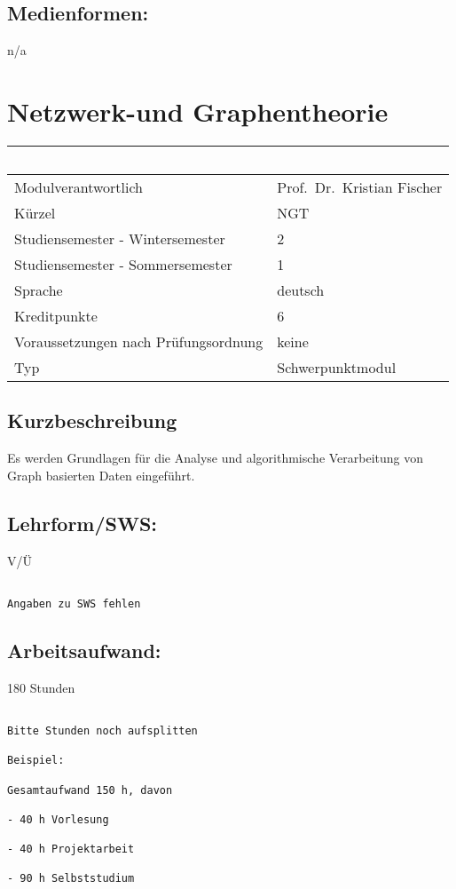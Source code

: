 \section*{Medienformen:}\label{medienformen-10}

n/a

\chapter{Netzwerk-und Graphentheorie}\label{netzwerk-und-graphentheorie}

\begin{longtable}[]{@{}ll@{}}
\toprule
~ & ~\tabularnewline
\midrule
\endhead
Modulverantwortlich & Prof.~Dr.~Kristian Fischer\tabularnewline
Kürzel & NGT\tabularnewline
Studiensemester - Wintersemester & 2\tabularnewline
Studiensemester - Sommersemester & 1\tabularnewline
Sprache & deutsch\tabularnewline
Kreditpunkte & 6\tabularnewline
Voraussetzungen nach Prüfungsordnung & keine\tabularnewline
Typ & Schwerpunktmodul\tabularnewline
\bottomrule
\end{longtable}

\section*{Kurzbeschreibung}\label{kurzbeschreibung-5}

Es werden Grundlagen für die Analyse und algorithmische Verarbeitung von
Graph basierten Daten eingeführt.

\section*{Lehrform/SWS:}\label{lehrformsws-11}

V/Ü

\begin{verbatim}

Angaben zu SWS fehlen
\end{verbatim}

\section*{Arbeitsaufwand:}\label{arbeitsaufwand-17}

180 Stunden

\begin{verbatim}

Bitte Stunden noch aufsplitten

Beispiel:

Gesamtaufwand 150 h, davon 

- 40 h Vorlesung 

- 40 h Projektarbeit  

- 90 h Selbststudium 
\end{verbatim}

